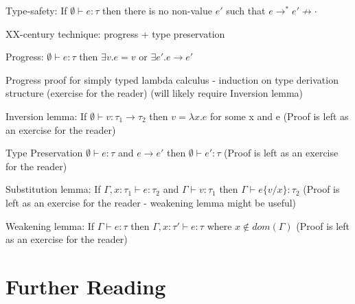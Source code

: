 Type-safety: If $\emptyset\vdash e: \tau$ then there is no non-value $e'$
such that $e \longrightarrow^* e' \not\longrightarrow \cdot$

XX-century technique: progress + type preservation

Progress: $\emptyset\vdash e: \tau$ then $\exists v.e=v$ or $\exists e'.e \longrightarrow e'$

Progress proof for simply typed lambda calculus - induction on type derivation structure
(exercise for the reader) (will likely require Inversion lemma)

Inversion lemma:
If $\emptyset\vdash v : \tau_1 \to \tau_2$ then $v = \lambda x.e$ for some x and e
(Proof is left as an exercise for the reader)

Type Preservation
$\emptyset\vdash e : \tau$ and $e \longrightarrow e'$ then $\emptyset\vdash e' : \tau$
(Proof is left as an exercise for the reader)

Substitution lemma:
If $\Gamma, x:\tau_1 \vdash e : \tau_2$ and $\Gamma\vdash v : \tau_1$
then $\Gamma\vdash e\{v/x\} : \tau_2$
(Proof is left as an exercise for the reader - weakening lemma might be useful)

Weakening lemma:
If $\Gamma\vdash e : \tau$ then $\Gamma, x:\tau' \vdash e : \tau$ where $x\not\in dom(\Gamma)$
(Proof is left as an exercise for the reader)

\section{Further Reading}
